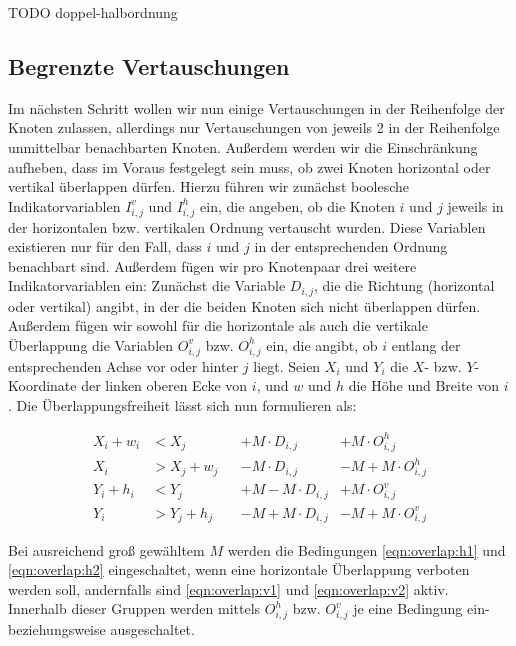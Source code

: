 TODO doppel-halbordnung

\subsection{Begrenzte Vertauschungen}
\label{sub:ilp:2}

Im nächsten Schritt wollen wir nun einige Vertauschungen in der Reihenfolge der Knoten zulassen, allerdings nur Vertauschungen von jeweils 2 in der Reihenfolge unmittelbar benachbarten Knoten. Außerdem werden wir die Einschränkung aufheben, dass im Voraus festgelegt sein muss, ob zwei Knoten horizontal oder vertikal überlappen dürfen. Hierzu führen wir zunächst boolesche Indikatorvariablen $I^{v}_{i,j}$ und $I^{h}_{i,j}$ ein, die angeben, ob die Knoten $i$ und $j$ jeweils in der horizontalen bzw. vertikalen Ordnung vertauscht wurden. Diese Variablen existieren nur für den Fall, dass $i$ und $j$ in der entsprechenden Ordnung benachbart sind. Außerdem fügen wir pro Knotenpaar drei weitere Indikatorvariablen ein: Zunächst die Variable $D_{i,j}$, die die Richtung (horizontal oder vertikal) angibt, in der die beiden Knoten sich nicht überlappen dürfen. Außerdem fügen wir sowohl für die horizontale als auch die vertikale Überlappung die Variablen $O^{v}_{i,j}$ bzw. $O^{h}_{i,j}$ ein, die angibt, ob $i$ entlang der entsprechenden Achse vor oder hinter $j$ liegt. Seien $X_i$ und $Y_i$ die $X$- bzw. $Y$-Koordinate der linken oberen Ecke von $i$, und $w$ und $h$ die Höhe und Breite von $i$. Die Überlappungsfreiheit lässt sich nun formulieren als:

\begin{align}
	X_i + w_i &< X_j &&+ M \cdot D_{i,j} &+ M \cdot O^{h}_{i,j} \label{eqn:overlap:h1}\\
	X_i &> X_j + w_j &&- M \cdot D_{i,j} &- M + M \cdot O^{h}_{i,j} \label{eqn:overlap:h2}\\
	Y_i + h_i &< Y_j &&+ M - M \cdot D_{i,j} &+ M \cdot O^{v}_{i,j} \label{eqn:overlap:v1}\\
	Y_i &> Y_j + h_j &&- M + M \cdot D_{i,j} &- M + M \cdot O^{v}_{i,j} \label{eqn:overlap:v2}
\end{align}

Bei ausreichend groß gewähltem $M$ werden die Bedingungen \ref{eqn:overlap:h1} und \ref{eqn:overlap:h2} eingeschaltet, wenn eine horizontale Überlappung verboten werden soll, andernfalls sind  \ref{eqn:overlap:v1} und \ref{eqn:overlap:v2} aktiv. Innerhalb dieser Gruppen werden mittels $O^{h}_{i,j}$ bzw. $O^{v}_{i,j}$ je eine Bedingung ein- beziehungsweise ausgeschaltet.

